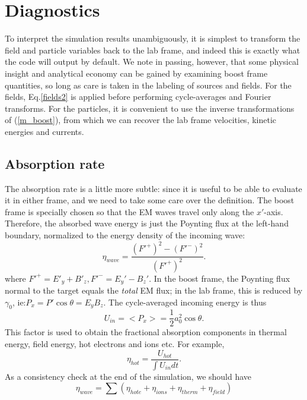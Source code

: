 \documentclass[11pt]{article}
\def\be{\begin{equation}}
\def\ee{\end{equation}}
\begin{document}
\section{Diagnostics}

To interpret the simulation results unambiguously, it is simplest to 
transform the field and particle variables back to the lab frame, and indeed this is exactly what the code will output by default.
We note in passing, however, that some physical insight and analytical
economy can be 
gained by examining boost frame quantities, so long as care is taken 
in the labeling of sources and fields.
For the fields, Eq.\ref{fields2} is applied before performing cycle-averages
and Fourier transforms.  For the particles, it is convenient to use the 
inverse transformations of (\ref{m_boost}), from which we can recover the
lab frame velocities, kinetic energies and currents.

\subsection{Absorption rate}
The absorption rate is a little more subtle: since it is useful to be able
to evaluate it in either frame, and we need to take some care over the 
definition.  The boost frame is specially chosen so that the EM waves travel
only along the $x'$-axis.  Therefore, the absorbed wave energy is just the 
 Poynting flux at the left-hand boundary, normalized to the energy
density of the incoming wave:
%
\be
\eta_{wave} = \frac{({F'^+})^2 - ({F'^-})^2}{({F'^+})^2}.
\ee
%
where $F'^+=E'_y+B'_z, F'^-=E_y'-B_z'$.  In the boost frame, the Poynting 
flux normal to the target equals the {\em total} EM flux; in the lab frame,
this is reduced by $\gamma_0$, ie:$P_x = P'\cos\theta = E_yB_z$. 
The cycle-averaged incoming energy is thus 
%
\be 
U_{in} = <P_x> = \frac{1}{2}a_0^2\cos\theta.
\ee
%
This factor is used to obtain the fractional absorption components in thermal energy,
field energy, hot electrons and ions etc.  For example,
%
\be
\eta_{hot} = \frac{U_{hot}}{\int U_{in}dt} \nonumber.
\ee
%
As a consistency check at the end of the simulation, we should have
%
\be
\eta_{wave} = \sum\left(\eta_{hot e} + \eta_{ions} + \eta_{therm} + 
\eta_{field} \right) \nonumber
\ee
\end{document}
